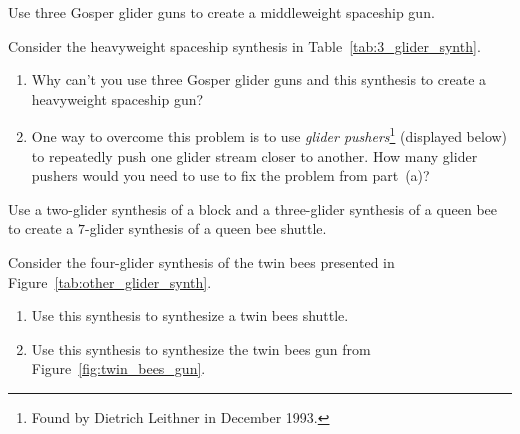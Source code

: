 \begin{multicols}{2}
	
	\begin{problem}\label{exer:mwss_gun}
		Use three Gosper glider guns to create a middleweight spaceship gun.
	\end{problem}
	
	
	\mfilbreak
	
	
	\begin{problem}\label{exer:hwss_gun}
		Consider the heavyweight spaceship synthesis in Table~\ref{tab:3_glider_synth}.
		\begin{enumerate}[label=\bf\color{ocre}(\alph*)]
			\item Why can't you use three Gosper glider guns and this synthesis to create a heavyweight spaceship gun?
			
			\item One way to overcome this problem is to use \emph{glider pushers}\footnote{Found by Dietrich Leithner in December 1993.} (displayed below) to repeatedly push one glider stream closer to another. How many glider pushers would you need to use to fix the problem from part~(a)?\smallskip
			
			\begin{minipage}{\linewidth}
				\centering
			\end{minipage}
		\end{enumerate}
	\end{problem}
	
	
	\mfilbreak
	
	
	\begin{problem}\label{exer:queen_bee_synth}
		Use a two-glider synthesis of a block and a three-glider synthesis of a queen bee to create a $7$-glider synthesis of a queen bee shuttle.
	\end{problem}
	
	
	\mfilbreak
	
	
	\begin{problem}\label{exer:twin_bee_shuttle_synth}
		Consider the four-glider synthesis of the twin bees presented in Figure~\ref{tab:other_glider_synth}.\smallskip
		
		\begin{enumerate}[label=\bf\color{ocre}(\alph*)]
			\item Use this synthesis to synthesize a twin bees shuttle.
			
			\item Use this synthesis to synthesize the twin bees gun from Figure~\ref{fig:twin_bees_gun}.
		\end{enumerate}
	\end{problem}
	

\end{multicols}
